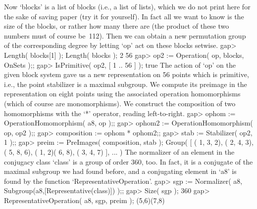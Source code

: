Now `blocks' is a list of blocks (i.e., a list of lists), which we do not
print  here for the  sake of saving paper (try  it for yourself). In fact
all we want to know is the size of  the blocks, or  rather how many there
are (the product of these two numbers must of course be~112). Then we can
obtain a new  permutation group  of the  corresponding  degree by letting
`op' act on these blocks setwise.
\beginexample
    gap> Length( blocks[1] );  Length( blocks );
    2
    56
    gap> op2 := Operation( op, blocks, OnSets );;
    gap> IsPrimitive( op2, [ 1 .. 56 ] );
    true
\endexample
The action of `op' on the given block system gave us a new representation
on 56 points which is primitive, i.e., the  point stabilizer is a maximal
subgroup. We  compute its preimage in the  representation on eight points
using the   associated   operation homomorphisms (which   of   course are
monomorphisms). We construct  the  composition of two  homomorphisms with
the `*' operator, reading left-to-right.
\beginexample
    gap> ophom := OperationHomomorphism( a8, op );;
    gap> ophom2 := OperationHomomorphism( op, op2 );;
    gap> composition := ophom * ophom2;;
    gap> stab := Stabilizer( op2, 1 );;
    gap> preim := PreImages( composition, stab );
    Group( [ ( 1, 3, 2), ( 2, 4, 3), ( 5, 8, 6), ( 1, 2)( 6, 8),
      ( 3, 4, 7) ], ... )
\endexample
The normalizer of an element in the conjugacy class `class' is a group of
order 360, too. In fact, it is a conjugate of the maximal subgroup we had
found before, and a conjugating element in `a8'  is found by the function
`RepresentativeOperation'.
\beginexample
    gap> sgp := Normalizer( a8, Subgroup(a8,[Representative(class)]) );;
    gap> Size( sgp );
    360
    gap> RepresentativeOperation( a8, sgp, preim );
    (5,6)(7,8)
\endexample

